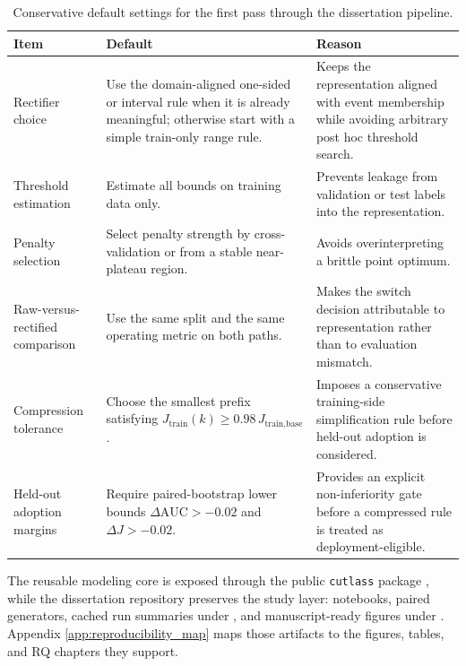 \begin{table}[p]
    \caption[Conservative defaults for a new dataset.]{Conservative default settings for the first pass through the dissertation pipeline.}
    \label{tab:workflow_defaults}
    \centering
        {
        \setlength{\tabcolsep}{3pt}
        \renewcommand{\arraystretch}{0.95}
        \begin{tabularx}{0.96\textwidth}{>{\RaggedRight\arraybackslash}p{}>{\RaggedRight\arraybackslash}p{}>{\RaggedRight\arraybackslash}X}
            Item & Default & Reason \\ \hline
            Rectifier choice & Use the domain-aligned one-sided or interval rule when it is already meaningful; otherwise start with a simple train-only range rule. & Keeps the representation aligned with event membership while avoiding arbitrary post hoc threshold search. \\ \hline
            Threshold estimation & Estimate all bounds on training data only. & Prevents leakage from validation or test labels into the representation. \\ \hline
            Penalty selection & Select penalty strength by cross-validation or from a stable near-plateau region. & Avoids overinterpreting a brittle point optimum. \\ \hline
            Raw-versus-rectified comparison & Use the same split and the same operating metric on both paths. & Makes the switch decision attributable to representation rather than to evaluation mismatch. \\ \hline
            Compression tolerance & Choose the smallest prefix satisfying $J_{\text{train}}(k)\geq 0.98\,J_{\text{train,base}}$. & Imposes a conservative training-side simplification rule before held-out adoption is considered. \\ \hline
            Held-out adoption margins & Require paired-bootstrap lower bounds $\Delta \mathrm{AUC}>-0.02$ and $\Delta J>-0.02$. & Provides an explicit non-inferiority gate before a compressed rule is treated as deployment-eligible. \\ \hline
        \end{tabularx}
        }
\end{table}

The reusable modeling core is exposed through the public \texttt{cutlass} package \autocite{orender2026cutlass}, while the dissertation repository preserves the study layer: notebooks, paired  generators, cached run summaries under , and manuscript-ready figures under  \autocite{orender2026dissertationrepo}. Appendix \ref{app:reproducibility_map} maps those artifacts to the figures, tables, and RQ chapters they support.

